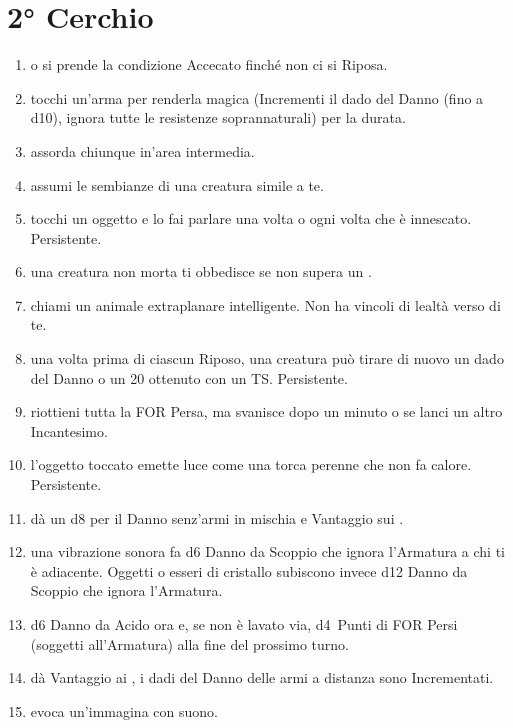 \documentclass[itdr]{subfiles}
\begin{document}
\section{2° Cerchio}
\def \spellcircle {2}
\begin{enumerate}
	\item {}  o si prende la condizione Accecato finché non ci si Riposa.
	\item {} tocchi un'arma per renderla magica (Incrementi il dado del Danno (fino a d10), ignora tutte le resistenze soprannaturali) per la durata.
	\item {} assorda chiunque in'area intermedia.
	\item {} assumi le sembianze di una creatura simile a te.
	\item {} tocchi un oggetto e lo fai parlare una volta o ogni volta che è innescato. Persistente.
	\item {} una creatura non morta ti obbedisce se non supera un .
	\item {} chiami un animale extraplanare intelligente. Non ha vincoli di lealtà verso di te.
	\item {} una volta prima di ciascun Riposo, una creatura può tirare di nuovo un dado del Danno o un 20 ottenuto con un TS. Persistente.
	\item {} riottieni tutta la FOR Persa, ma svanisce dopo un minuto o se lanci un altro Incantesimo.
	\item {} l'oggetto toccato emette luce come una torca perenne che non fa calore. Persistente.
	\item {} dà un d8 per il Danno senz'armi in mischia e Vantaggio sui .
	\item {} una vibrazione sonora fa d6 Danno da Scoppio che ignora l'Armatura a chi ti è adiacente. Oggetti o esseri di cristallo subiscono invece d12 Danno da Scoppio che ignora l'Armatura.
	\item {} d6 Danno da Acido ora e, se non è lavato via, d4~Punti di FOR Persi (soggetti all'Armatura) alla fine del prossimo turno.
	\item {} dà Vantaggio ai , i dadi del Danno delle armi a distanza sono Incrementati.
	\item {} evoca un'immagina con suono.

\end{enumerate}
\end{document}
